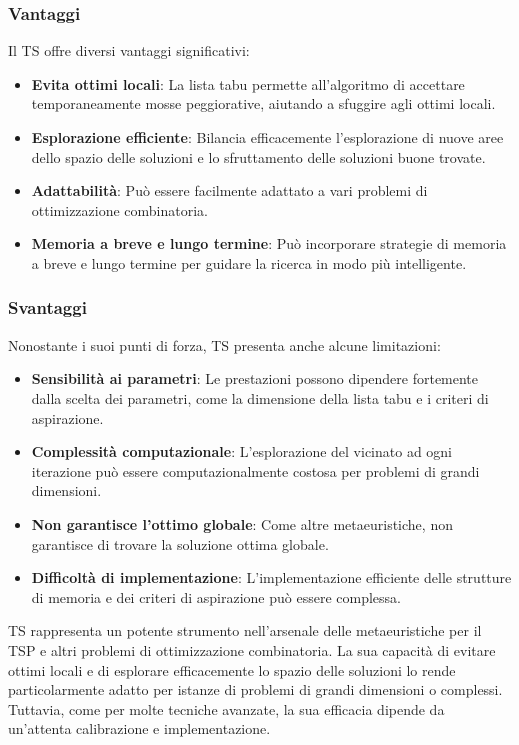 \subsubsection{Vantaggi}

Il \gls{TS} offre diversi vantaggi significativi:

\begin{itemize}
	\item \textbf{Evita ottimi locali}: La lista tabu permette all'algoritmo di accettare temporaneamente mosse peggiorative, aiutando a sfuggire agli ottimi locali.
	\item \textbf{Esplorazione efficiente}: Bilancia efficacemente l'esplorazione di nuove aree dello spazio delle soluzioni e lo sfruttamento delle soluzioni buone trovate.
	\item \textbf{Adattabilità}: Può essere facilmente adattato a vari problemi di ottimizzazione combinatoria.
	\item \textbf{Memoria a breve e lungo termine}: Può incorporare strategie di memoria a breve e lungo termine per guidare la ricerca in modo più intelligente.
\end{itemize}

\subsubsection{Svantaggi}

Nonostante i suoi punti di forza, \gls{TS} presenta anche alcune limitazioni:

\begin{itemize}
	\item \textbf{Sensibilità ai parametri}: Le prestazioni possono dipendere fortemente dalla scelta dei parametri, come la dimensione della lista tabu e i criteri di aspirazione.
	\item \textbf{Complessità computazionale}: L'esplorazione del vicinato ad ogni iterazione può essere computazionalmente costosa per problemi di grandi dimensioni.
	\item \textbf{Non garantisce l'ottimo globale}: Come altre metaeuristiche, non garantisce di trovare la soluzione ottima globale.
	\item \textbf{Difficoltà di implementazione}: L'implementazione efficiente delle strutture di memoria e dei criteri di aspirazione può essere complessa.
\end{itemize}


\gls{TS} rappresenta un potente strumento nell'arsenale delle metaeuristiche per il \gls{TSP} e altri problemi di ottimizzazione combinatoria. La sua capacità di evitare ottimi locali e di esplorare efficacemente lo spazio delle soluzioni lo rende particolarmente adatto per istanze di problemi di grandi dimensioni o complessi. Tuttavia, come per molte tecniche avanzate, la sua efficacia dipende da un'attenta calibrazione e implementazione.

